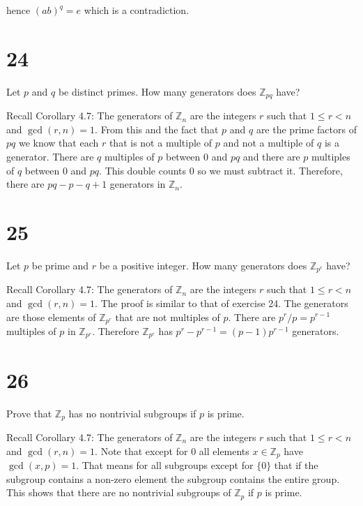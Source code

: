 \documentclass[a4paper]{article}
\begin{document}
hence $(ab)^q = e$ which is a contradiction. 



\section*{24}

Let $p$ and $q$ be distinct primes. How many generators does $\mathbb{Z}_{pq}$ have?

\vspace{\baselineskip}

Recall Corollary 4.7: The generators of $\mathbb{Z}_n$ are the integers $r$ such that $1 \leq r < n$ and $\gcd(r,n) = 1$. From this and the fact that $p$ and $q$ are the prime factors of $pq$ we know that each $r$ that is not a multiple of $p$ and not a multiple of $q$ is a generator. There are $q$ multiples of $p$ between 0 and $pq$ and there are $p$ multiples of $q$ between 0 and $pq$. This double counts 0 so we must subtract it. Therefore, there are $pq - p - q + 1$ generators in $\mathbb{Z}_n$.


\section*{25}

Let $p$ be prime and $r$ be a positive integer. How many generators does $\mathbb{Z}_{p^r}$ have?

\vspace{\baselineskip}

Recall Corollary 4.7: The generators of $\mathbb{Z}_n$ are the integers $r$ such that $1 \leq r < n$ and $\gcd(r,n) = 1$. The proof is similar to that of exercise 24. The generators are those elements of $\mathbb{Z}_{p^r}$ that are not multiples of $p$. There are $p^r / p = p^{r-1}$ multiples of $p$ in $\mathbb{Z}_{p^r}$. Therefore $\mathbb{Z}_{p^r}$ has $p^r - p^{r-1} = (p-1)p^{r-1}$ generators.


\section*{26}

Prove that $\mathbb{Z}_p$ has no nontrivial subgroups if $p$ is prime.

\vspace{\baselineskip}

Recall Corollary 4.7: The generators of $\mathbb{Z}_n$ are the integers $r$ such that $1 \leq r < n$ and $\gcd(r,n) = 1$. Note that except for 0 all elements  $x \in \mathbb{Z}_p$ have $\gcd(x, p) = 1$. That means for all subgroups except for $\{ 0 \}$ that if the subgroup contains a non-zero element the subgroup contains the entire group. This shows that there are no nontrivial subgroups of $\mathbb{Z}_p$ if $p$ is prime.
\end{document}
